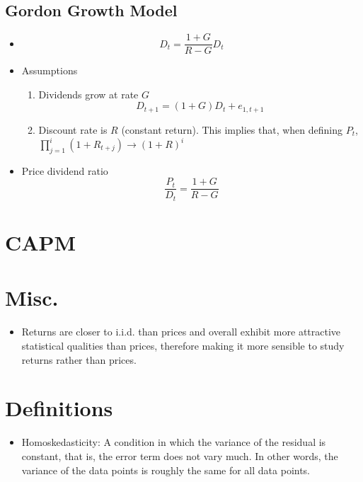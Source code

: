 \documentclass[11pt]{article}
\begin{document}
\subsection{Gordon Growth Model}
\begin{itemize}
    \item \[D_t = \frac{1+G}{R-G} D_t\]
    \item Assumptions 
    \begin{enumerate}
        \item Dividends grow at rate $G$ 
        \[D_{t+1} = (1+G) D_t +e_{1,t+1}\]
        \item Discount rate is $R$ (constant return). This implies that, when defining $P_t$, 
        $\prod_{j=1}^{i} (1 + R_{t+j}) \rightarrow {(1+R)}^i$
    \end{enumerate}
    \item Price dividend ratio 
    \[\frac{P_t}{D_t} = \frac{1+G}{R-G}\]
\end{itemize}


\section{CAPM}

\section{Misc.}
\begin{itemize}
    \item Returns are closer to i.i.d. than prices and overall exhibit more attractive 
    statistical qualities than prices, therefore making it more sensible to study returns 
    rather than prices. 
\end{itemize}

\section{Definitions}
\begin{itemize}
    \item Homoskedasticity: A condition in which the variance of the residual is constant, that
    is, the error term does not vary much. In other words, the variance of the data points is 
    roughly the same for all data points. 
\end{itemize}
\end{document}
